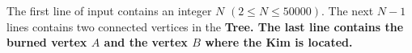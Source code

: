 The first line of input contains an integer $N$ $(2 \leq N \leq 50000)$.
The next $N-1$ lines contains two connected vertices in the \bf{Tree}.
The last line contains the burned vertex $A$ and the vertex $B$ where the Kim is located.

